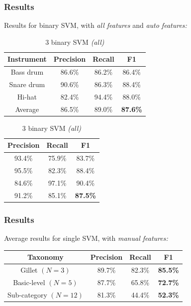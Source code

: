 \documentclass{beamer}
\begin{document}
    \begin{frame}
        \frametitle{Results}
        Results for binary SVM, with \emph{all features} and \emph{auto features:}
                \begin{center}
                \footnotesize 
        \begin{table}
        \parbox{.50\linewidth}{       
            \caption{3 binary SVM \emph{(auto)}}
        \begin{tabular}{|c|c|c|c|}
        \hline
        Instrument&Precision&Recall&F1\\
        \hline
        Bass drum&86.6\%&86.2\%&86.4\%\\
        \hline
        Snare drum&90.6\%&86.3\%&88.4\%\\
        \hline
        Hi-hat&82.4\%&94.4\%&88.0\%\\
        \hline
        Average&86.5\%&89.0\%&\textbf{87.6\%}\\
        \hline
        \end{tabular}
        }
        \hfill
        \parbox{.40\linewidth}{
            \caption{3 binary SVM \emph{(all)}}
        \begin{tabular}{|c|c|c|}
        \hline
        Precision&Recall&F1\\
        \hline
        93.4\%&75.9\%&83.7\%\\
        \hline
        95.5\%&82.3\%&88.4\%\\
        \hline
        84.6\%&97.1\%&90.4\%\\
        \hline
        91.2\%&85.1\%&\textbf{87.5\%}\\
        \hline
        \end{tabular}
        }
        \end{table}
        \end{center}
    \end{frame}
    \begin{frame}
        \frametitle{Results}
        Average results for single SVM, with \emph{manual features:}
        \begin{center}
        \begin{tabular}{|c|c|c|c|}
        \hline
        Taxonomy&Precision&Recall&F1\\
        \hline
        Gillet $(N=3)$&89.7\%&82.3\%&\textbf{85.5\%}\\
        \hline
        Basic-level $(N=5)$&87.7\%&65.8\%&\textbf{72.7\%}\\
        \hline
        Sub-category $(N=12)$&81.3\%&44.4\%&\textbf{52.3\%}\\
        \hline
        \end{tabular}
        \end{center}
    \end{frame}
\end{document}
